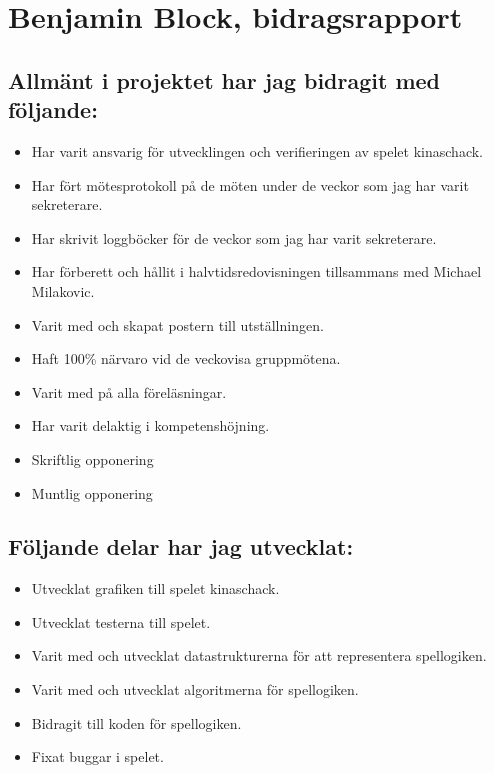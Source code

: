 
\section{Benjamin Block, bidragsrapport}
\subsection{Allmänt i projektet har jag bidragit med följande:}
\begin{itemize}
  \item Har varit ansvarig för utvecklingen och verifieringen av spelet kinaschack.
  \item Har fört mötesprotokoll på de möten under de veckor som jag har varit sekreterare.
  \item Har skrivit loggböcker för de veckor som jag har varit sekreterare.
  \item Har förberett och hållit i halvtidsredovisningen tillsammans med Michael Milakovic.
  \item Varit med och skapat postern till utställningen.
  \item Haft 100\% närvaro vid de veckovisa gruppmötena.
  \item Varit med på alla föreläsningar.
  \item Har varit delaktig i kompetenshöjning.
  \item Skriftlig opponering
  \item Muntlig opponering
\end{itemize}

\subsection{Följande delar har jag utvecklat:}
\begin{itemize}
  \item Utvecklat grafiken till spelet kinaschack.
  \item Utvecklat testerna till spelet.
  \item Varit med och utvecklat datastrukturerna för att representera spellogiken.
  \item Varit med och utvecklat algoritmerna för spellogiken.
  \item Bidragit till koden för spellogiken.
  \item Fixat buggar i spelet.
\end{itemize}


